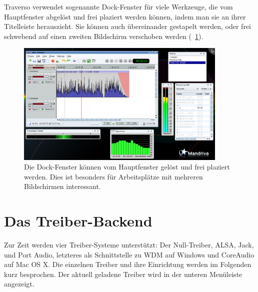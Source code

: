 Traverso verwendet sogenannte Dock-Fenster für viele Werkzeuge, die vom Hauptfenster abgelöst und frei plaziert werden können, indem man sie an ihrer Titelleiste herauszieht. Sie können auch übereinander gestapelt werden, oder frei schwebend auf einen zweiten Bildschirm verschoben werden (\FigB\ \ref{fig_mainwin02}).

\begin{figure}
 \centering\includegraphics[width=0.9\textwidth]{../images/sshot03.png}
 \caption{Die Dock-Fenster können vom Hauptfenster gelöst und frei plaziert werden. Dies ist besonders für Arbeitsplätze mit mehreren Bildschirmen interessant.}
 \label{fig_mainwin02}
\end{figure}

\section{Das Treiber-Backend}
Zur Zeit werden vier Treiber-Systeme unterstützt: Der Null-Treiber, ALSA, Jack, und Port Audio, letzteres als Schnittstelle zu WDM auf Windows und CoreAudio auf Mac OS X. Die einzelnen Treiber und ihre Einrichtung werden im Folgenden kurz besprochen. Der aktuell geladene Treiber wird in der unteren Menüleiste angezeigt.

